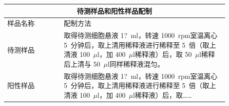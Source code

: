 \documentclass[UTF8,10pt,a4paper,fontset=fandol]{ctexart}
\newcommand{\fieldvalue}[1]{#1}
\newcommand{\handwritten}[1]{#1}
\begin{document}
\begin{center}
\small
\begin{tabular}{|p{0.23\linewidth}|p{0.67\linewidth}|}
\hline
\multicolumn{2}{|c|}{待测样品和阳性样品配制}\\
\hline
样品名称 & 配制方法\\
\hline
待测样品 &
取得待测细胞悬液
\fieldvalue{\handwritten{1?}}~ml，转速
\fieldvalue{\handwritten{1000}}~rpm室温离心
\fieldvalue{\handwritten{5}}~分钟后，取上清用稀释液进行稀释至
\fieldvalue{\handwritten{5}}~倍（取上清液
\fieldvalue{\handwritten{100}}~$\mu$l，加
\fieldvalue{\handwritten{400}}~$\mu$l稀释液）后，取
\fieldvalue{\handwritten{50}}~$\mu$l稀释后上清与
\fieldvalue{\handwritten{50}}~$\mu$l同样稀释液混匀。\\
\hline
阳性样品 &
取得待测细胞悬液
\fieldvalue{\handwritten{1?}}~ml，转速
\fieldvalue{\handwritten{1000}}~rpm室温离心
\fieldvalue{\handwritten{5}}~分钟后，取上清用稀释液进行稀释至
\fieldvalue{\handwritten{5}}~倍（取上清液
\fieldvalue{\handwritten{100}}~$\mu$l，加
\fieldvalue{\handwritten{400}}~$\mu$l稀释液）后，取……\\
\hline
\end{tabular}
\end{center}
\end{document}
